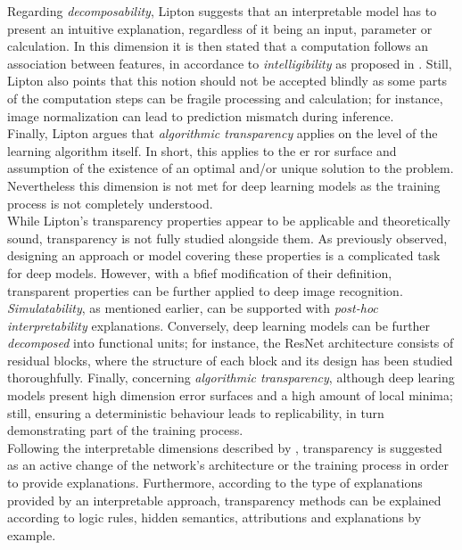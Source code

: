 Regarding \emph{decomposability}, Lipton suggests that an interpretable model has to present 
an intuitive explanation, regardless of it being an input, parameter or calculation. In this 
dimension it is then stated that a computation follows an association between features, in 
accordance to \emph{intelligibility} as proposed in \autocite{lou2012intelligible}. Still, Lipton 
also points that this notion should not be accepted blindly as some parts of the computation steps 
can be fragile processing and calculation; for instance, image normalization can lead to prediction 
mismatch during inference.\\

Finally, Lipton argues that \emph{algorithmic transparency} applies on the level of the learning 
algorithm itself. In short, this applies to the er ror surface and assumption of the existence of 
an optimal and/or unique solution to the problem. Nevertheless this dimension is not met for deep 
learning models as the training process is not completely understood.\\

\noindent While Lipton's transparency properties appear to be applicable and theoretically sound, 
transparency is not fully studied alongside them. As previously observed, designing an approach or 
model covering these properties is a complicated task for deep models. However, with a bfief 
modification of their definition, transparent properties can be further applied to deep image 
recognition. \emph{Simulatability}, as mentioned earlier,  can be supported with \emph{post-hoc 
interpretability} explanations. Conversely, deep learning models can be further 
\emph{decomposed} into functional units; for instance, the ResNet architecture consists of
residual blocks, where the structure of each block and its design has been studied thoroughfully. 
Finally, concerning \emph{algorithmic transparency}, although deep learing models present high 
dimension error surfaces and a high amount of local minima; still, ensuring a deterministic 
behaviour leads to replicability, in turn demonstrating part of the training process.\\

\noindent Following the interpretable dimensions described by \autocite{zhang2021survey}, 
transparency is suggested as an active change of the network's architecture or the training process 
in order to provide explanations. Furthermore, according to the type of explanations provided by an 
interpretable approach, transparency methods can be explained according to logic rules, hidden 
semantics, attributions and explanations by example.\\

